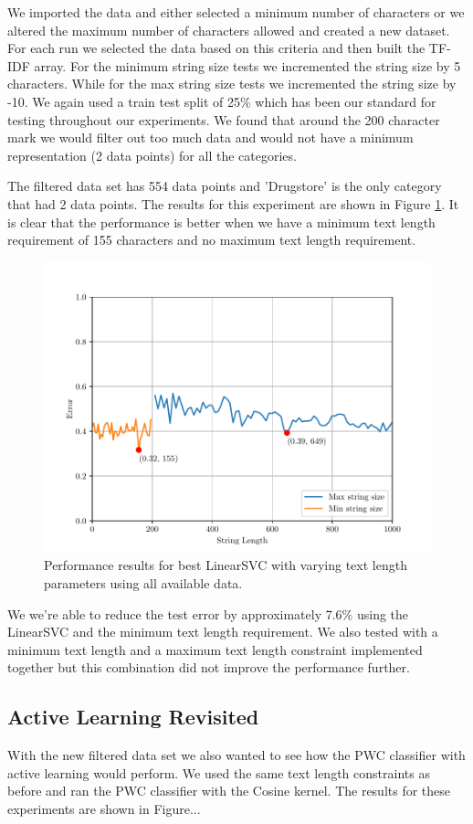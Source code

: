 We imported the data and either selected a minimum number of characters or we altered the maximum number of characters allowed and created a new dataset. For each run we selected the data based on this criteria and then built the TF-IDF array. For the minimum string size tests we incremented the string size by 5 characters. While for the max string size tests we incremented the string size by -10. We again used a train test split of 25\% which has been our standard for testing throughout our experiments. We found that around the 200 character mark we would filter out too much data and would not have a minimum representation (2 data points) for all the categories. 

The filtered data set has 554 data points and 'Drugstore' is the only category that had 2 data points. The results for this experiment are shown in Figure \ref{fig:grid_search_text_length}. It is clear that the performance is better when we have a minimum text length requirement of 155 characters and no maximum text length requirement. 

\begin{figure}[ht]
    \centering
    \includegraphics[width=\scale\textwidth]{../img/plot_data_length_grid_search.pdf}
    \caption{Performance results for best LinearSVC with varying text length parameters using all available data.}
    \label{fig:grid_search_text_length}
  \end{figure}

We we're able to reduce the test error by approximately 7.6\% using the LinearSVC and the minimum text length requirement. We also tested with a minimum text length and a maximum text length constraint implemented together but this combination did not improve the performance further.

\subsection{Active Learning Revisited}

With the new filtered data set we also wanted to see how the PWC classifier with active learning would perform. We used the same text length constraints as before and ran the PWC classifier with the Cosine kernel. The results for these experiments are shown in Figure...



